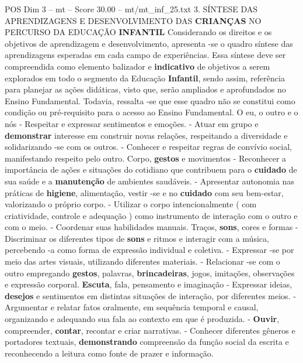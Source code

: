 \begin{textsample}{POS Dim 3 – mt – Score 30.00 – mt/mt\_inf\_25.txt}  \label{ex:f3_pos_072}
3.
SÍNTESE DAS APRENDIZAGENS E DESENVOLVIMENTO DAS \textbf{CRIANÇAS} NO PERCURSO DA EDUCAÇÃO \textbf{INFANTIL} Considerando os direitos e os objetivos de aprendizagem e desenvolvimento, apresenta -se o quadro síntese das aprendizagens esperadas em cada campo de experiências.
Essa síntese deve ser compreendida como elemento balizador e \textbf{indicativo} de objetivos a serem explorados em todo o segmento da Educação \textbf{Infantil}, sendo assim, referência para planejar as ações didáticas, visto que, serão ampliados e aprofundados no Ensino Fundamental.
Todavia, ressalta -se que esse quadro não se constitui como condição ou pré-requisito para o acesso ao Ensino Fundamental.
O eu, o outro e o nós - Respeitar e expressar sentimentos e emoções. - Atuar em grupo e \textbf{demonstrar} interesse em construir novas relações, respeitando a diversidade e solidarizando -se com os outros. - Conhecer e respeitar regras de convívio social, manifestando respeito pelo outro.
Corpo, \textbf{gestos} e movimentos - Reconhecer a importância de ações e situações do cotidiano que contribuem para o \textbf{cuidado} de sua saúde e a \textbf{manutenção} de ambientes saudáveis. - Apresentar autonomia nas práticas de \textbf{higiene}, alimentação, vestir -se e no \textbf{cuidado} com seu bem-estar, valorizando o próprio corpo. - Utilizar o corpo intencionalmente ( com criatividade, controle e adequação ) como instrumento de interação com o outro e com o meio. - Coordenar suas habilidades manuais.
Traços, \textbf{sons}, cores e formas - Discriminar os diferentes tipos de \textbf{sons} e ritmos e interagir com a música, percebendo -a como forma de expressão individual e coletiva. - Expressar -se por meio das artes visuais, utilizando diferentes materiais. - Relacionar -se com o outro empregando \textbf{gestos}, palavras, \textbf{brincadeiras}, jogos, imitações, observações e expressão corporal. \textbf{Escuta}, fala, pensamento e imaginação - Expressar ideias, \textbf{desejos} e sentimentos em distintas situações de interação, por diferentes meios. - Argumentar e relatar fatos oralmente, em sequência temporal e causal, organizando e adequando sua fala ao contexto em que é produzida. - \textbf{Ouvir}, compreender, \textbf{contar}, recontar e criar narrativas. - Conhecer diferentes gêneros e portadores textuais, \textbf{demonstrando} compreensão da função social da escrita e reconhecendo a leitura como fonte de prazer e informação.

\end{textsample}
